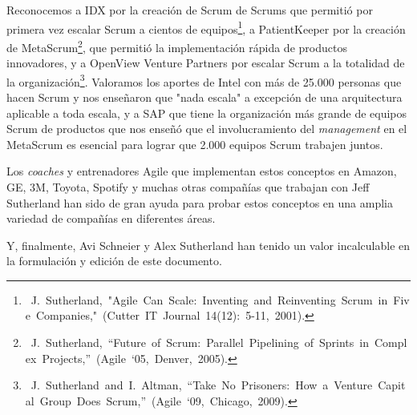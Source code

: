 \documentclass{article} %
\begin{document}
\noindent Reconocemos a IDX por la creaci\'{o}n de Scrum de Scrums que permiti\'{o} por primera vez escalar Scrum a cientos de equipos\footnote{\ J.\ Sutherland,\ "Agile\ Can\ Scale:\ Inventing\ and\ Reinventing\ Scrum\ in\ Five\ Companies,"\ (Cutter\ IT\ Journal\ 14(12):\ 5-11,\ 2001).}, a PatientKeeper por la creaci\'{o}n de MetaScrum\footnote{\ J.\ Sutherland,\ ``Future\ of\ Scrum:\ Parallel\ Pipelining\ of\ Sprints\ in\ Complex\ Projects,''\ (Agile\ `05,\ Denver,\ 2005).}, que permiti\'{o} la implementaci\'{o}n r\'{a}pida de productos innovadores, y a OpenView Venture Partners por escalar Scrum a la totalidad de la organizaci\'{o}n\footnote{\ J.\ Sutherland\ and\ I.\ Altman,\ ``Take\ No\ Prisoners:\ How\ a\ Venture\ Capital\ Group\ Does\ Scrum,''\ (Agile\ `09,\ Chicago,\ 2009).}. Valoramos los aportes de Intel con m\'{a}s de 25.000 personas que hacen Scrum y nos ense\~{n}aron que "nada escala" a excepci\'{o}n de una arquitectura aplicable a toda escala, y a SAP que tiene la organizaci\'{o}n m\'{a}s grande de equipos Scrum de productos que nos ense\~{n}\'{o} que el involucramiento del \textit{management }en el MetaScrum es esencial para lograr que 2.000 equipos Scrum trabajen juntos. 

\noindent 

\noindent Los \textit{coaches }y entrenadores Agile que implementan estos conceptos en Amazon, GE, 3M, Toyota, Spotify y muchas otras compa\~{n}\'{i}as que trabajan con Jeff Sutherland han sido de gran ayuda para probar estos conceptos en una amplia variedad de compa\~{n}\'{i}as en diferentes \'{a}reas.

\noindent 

\noindent Y, finalmente, Avi Schneier y Alex Sutherland han tenido un valor incalculable en la formulaci\'{o}n y edici\'{o}n de este documento.
\end{document}
